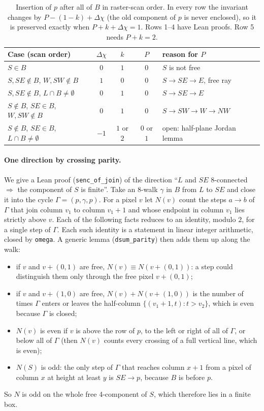 \documentclass[11pt]{article}
\theoremstyle{definition}
\theoremstyle{remark}
\begin{document}
\begin{table}[h]
\centering
\begin{tabular}{@{}lcccl@{}}
\toprule
Case (scan order) & $\Delta\chi$ & $k$ & $P$ & reason for $P$\\
\midrule
$S\in B$ & $0$ & $1$ & $0$ & $S$ is not free\\
$S,SE\notin B$, $W,SW\notin B$ & $1$ & $0$ & $0$ & $S\to SE\to E$, free ray\\
$S,SE\notin B$, $L\cap B\neq\emptyset$ & $0$ & $1$ & $0$ & $S\to SE\to E$\\
$S\notin B$, $SE\in B$, $W,SW\notin B$ & $0$ & $1$ & $0$ & $S\to SW\to W\to NW$\\
$S\notin B$, $SE\in B$, $L\cap B\neq\emptyset$ & $-1$ & $1$ or $2$ & $0$ or $1$ & open: half-plane Jordan lemma\\
\bottomrule
\end{tabular}
\caption{Insertion of $p$ after all of $B$ in raster-scan order. In every row the
invariant changes by $P-(1-k)+\Delta\chi$ (the old component of $p$ is never
enclosed), so it is preserved exactly when $P+k+\Delta\chi=1$. Rows 1--4 have Lean
proofs. Row 5 needs $P+k=2$.}
\label{tab:scan}
\end{table}


\paragraph{One direction by crossing parity.} We give a Lean proof
(\texttt{senc\_of\_join}) of the direction ``$L$ and $SE$ 8-connected
$\Rightarrow$ the component of $S$ is finite''. Take an 8-walk $\gamma$ in $B$ from
$L$ to $SE$ and close it into the cycle $\Gamma=(p,\gamma,p)$. For a pixel $v$ let
$N(v)$ count the steps $a\to b$ of $\Gamma$ that join column $v_1$ to column
$v_1+1$ and whose endpoint in column $v_1$ lies strictly above $v$. Each of the
following facts reduces to an identity, modulo $2$, for a single step of $\Gamma$.
Each such identity is a statement in linear integer arithmetic, closed by
\texttt{omega}. A generic lemma (\texttt{dsum\_parity}) then adds them up along the
walk:
\begin{itemize}
\item if $v$ and $v+(0,1)$ are free, $N(v)\equiv N(v+(0,1))$: a step could
  distinguish them only through the free pixel $v+(0,1)$;
\item if $v$ and $v+(1,0)$ are free, $N(v)+N(v+(1,0))$ is the number of times
  $\Gamma$ enters or leaves the half-column $\{(v_1+1,t):t>v_2\}$, which is even
  because $\Gamma$ is closed;
\item $N(v)$ is even if $v$ is above the row of $p$, to the left or right of all of
  $\Gamma$, or below all of $\Gamma$ (then $N(v)$ counts every crossing of a full vertical
  line, which is even);
\item $N(S)$ is odd: the only step of $\Gamma$ that reaches column $x+1$ from a pixel
  of column $x$ at height at least $y$ is $SE\to p$, because $B$ is before $p$.
\end{itemize}
So $N$ is odd on the whole free 4-component of $S$, which therefore lies in a
finite box.
\end{document}
